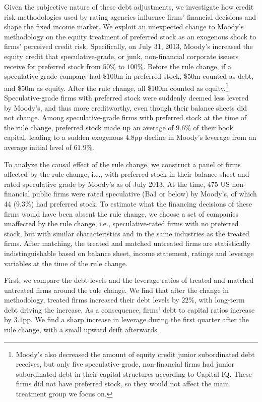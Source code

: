 \documentclass[a4paper, 12pt]{article}
\begin{document}
Given the subjective nature of these debt adjustments, we investigate how credit risk methodologies used by rating agencies influence firms' financial decisions and shape the fixed income market. We exploit an unexpected change to Moody's methodology on the equity treatment of preferred stock as an exogenous shock to firms' perceived credit risk. Specifically, on July 31, 2013, Moody's increased the equity credit that speculative-grade, or junk, non-financial corporate issuers receive for preferred stock from  $50\%$ to $100\%$. Before the rule change, if a speculative-grade company had \$100m in preferred stock, \$50m counted as debt, and \$50m as equity. After the rule change, all \$100m counted as equity.\footnote{Moody's also decreased the amount of equity credit junior subordinated debt receives, but only five speculative-grade, non-financial firms had junior subordinated debt in their capital structures according to Capital IQ. These firms did not have preferred stock, so they would not affect the main treatment group we focus on.}  Speculative-grade firms with preferred stock were suddenly deemed less levered by Moody's, and thus more creditworthy, even though their balance sheets did not change. Among speculative-grade firms with preferred stock at the time of the rule change, preferred stock made up an average of $9.6\%$ of their book capital, leading to a sudden exogenous $4.8$pp decline in Moody's leverage from an average initial level of $61.9$\%.


To analyze the causal effect of the rule change, we construct a panel of firms affected by the rule change, i.e., with preferred stock in their balance sheet and rated speculative grade by Moody's as of July 2013. At the time, 475 US non-financial public firms were rated speculative (Ba1 or below) by Moody's, of which 44 (9.3\%) had preferred stock. To estimate what the financing decisions of these firms would have been absent the rule change, we choose a set of companies unaffected by the rule change, i.e., speculative-rated firms with no preferred stock, but with similar characteristics and in the same industries as the treated firms. After matching, the treated and matched untreated firms are statistically indistinguishable based on balance sheet, income statement, ratings and leverage variables at the time of the rule change.

First, we compare the debt levels and the leverage ratios of treated and matched untreated firms around the rule change. We find that after the change in methodology, treated firms increased their debt levels by $22\%$, with long-term debt driving the increase. As a consequence, firms' debt to capital ratios increase by $3.1$pp. We find a sharp increase in leverage during the first quarter after the rule change, with a small upward drift afterwards.
\end{document}
